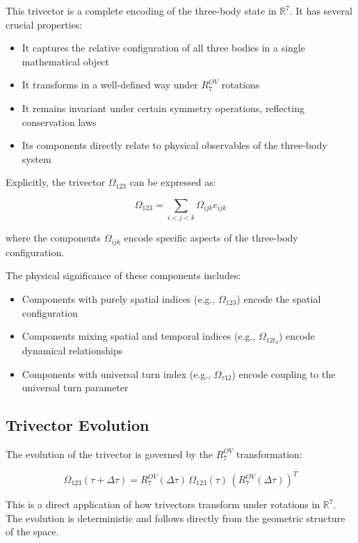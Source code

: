 \documentclass{article}
\begin{document}
This trivector is a complete encoding of the three-body state in $\mathbb{R}^7$. It has several crucial properties:

\begin{itemize}
\item It captures the relative configuration of all three bodies in a single mathematical object
\item It transforms in a well-defined way under $R^{OV}_7$ rotations
\item It remains invariant under certain symmetry operations, reflecting conservation laws
\item Its components directly relate to physical observables of the three-body system
\end{itemize}

Explicitly, the trivector $\Omega_{123}$ can be expressed as:

\begin{equation}
\Omega_{123} = \sum_{i<j<k} \Omega_{ijk} e_{ijk}
\end{equation}

where the components $\Omega_{ijk}$ encode specific aspects of the three-body configuration.

The physical significance of these components includes:
\begin{itemize}
\item Components with purely spatial indices (e.g., $\Omega_{123}$) encode the spatial configuration
\item Components mixing spatial and temporal indices (e.g., $\Omega_{12t_3}$) encode dynamical relationships
\item Components with universal turn index (e.g., $\Omega_{\tau 12}$) encode coupling to the universal turn parameter
\end{itemize}

\subsection{Trivector Evolution}

The evolution of the trivector is governed by the $R^{OV}_7$ transformation:

\begin{equation}
\Omega_{123}(\tau+\Delta\tau) = R^{OV}_7(\Delta\tau) \, \Omega_{123}(\tau) \, (R^{OV}_7(\Delta\tau))^T
\end{equation}

This is a direct application of how trivectors transform under rotations in $\mathbb{R}^7$. The evolution is deterministic and follows directly from the geometric structure of the space.
\end{document}
